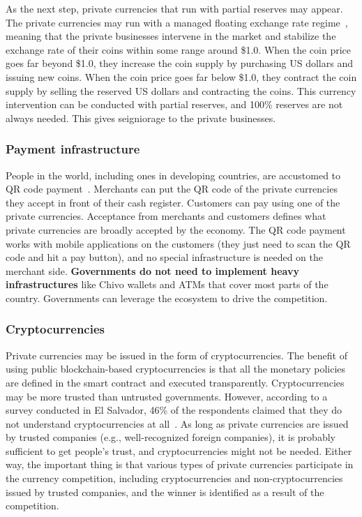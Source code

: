 \documentclass[dvipdfmx,a4paper]{article}
\begin{document}
As the next step, private currencies that run with partial reserves may appear. The private currencies may run with a managed floating exchange rate regime~\cite{calvo2002fear}, meaning that the private businesses intervene in the market and stabilize the exchange rate of their coins within some range around \$1.0. When the coin price goes far beyond \$1.0, they increase the coin supply by purchasing US dollars and issuing new coins. When the coin price goes far below \$1.0, they contract the coin supply by selling the reserved US dollars and contracting the coins. This currency intervention can be conducted with partial reserves, and 100\% reserves are not always needed. This gives seigniorage to the private businesses.

\subsubsection{Payment infrastructure}

People in the world, including ones in developing countries, are accustomed to QR code payment~\cite{yan2021qr}. Merchants can put the QR code of the private currencies they accept in front of their cash register. Customers can pay using one of the private currencies. Acceptance from merchants and customers defines what private currencies are broadly accepted by the economy. The QR code payment works with mobile applications on the customers (they just need to scan the QR code and hit a pay button), and no special infrastructure is needed on the merchant side. \textbf{Governments do not need to implement heavy infrastructures} like Chivo wallets and ATMs that cover most parts of the country. Governments can leverage the ecosystem to drive the competition.

\subsubsection{Cryptocurrencies}

Private currencies may be issued in the form of cryptocurrencies. The benefit of using public blockchain-based cryptocurrencies is that all the monetary policies are defined in the smart contract and executed transparently. Cryptocurrencies may be more trusted than untrusted governments. However, according to a survey conducted in El Salvador, 46\% of the respondents claimed that they do not understand cryptocurrencies at all~\cite{alonso2023salvador}. As long as private currencies are issued by trusted companies (e.g., well-recognized foreign companies), it is probably sufficient to get people's trust, and cryptocurrencies might not be needed. Either way, the important thing is that various types of private currencies participate in the currency competition, including cryptocurrencies and non-cryptocurrencies issued by trusted companies, and the winner is identified as a result of the competition.
\end{document}
